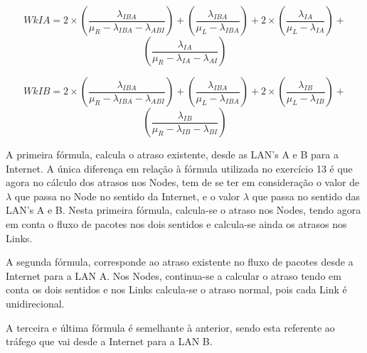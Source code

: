 \documentclass[pdftex,12pt,a4paper]{report}
\begin{document}
\[WkIA = 2 \times \left(\frac{\lambda_{IBA}}{\mu_{R} - \lambda_{IBA} - \lambda_{ABI}}\right) + 
\left(\frac{\lambda_{IBA}}{\mu_{L} - \lambda_{IBA}}\right) + 
 2 \times \left(\frac{\lambda_{IA}}{\mu_{L} - \lambda_{IA}}\right) + \]
\[\left(\frac{\lambda_{IA}}{\mu_{R} - \lambda_{IA} - \lambda_{AI}}\right)\]

\[WkIB = 2 \times \left(\frac{\lambda_{IBA}}{\mu_{R} - \lambda_{IBA} - \lambda_{ABI}}\right) + 
\left(\frac{\lambda_{IBA}}{\mu_{L} - \lambda_{IBA}}\right) + 
 2 \times \left(\frac{\lambda_{IB}}{\mu_{L} - \lambda_{IB}}\right) + \]
\[\left(\frac{\lambda_{IB}}{\mu_{R} - \lambda_{IB} - \lambda_{BI}}\right)\]

A primeira fórmula, calcula o atraso existente, desde as LAN's A e B para a Internet. A única diferença em relação à fórmula utilizada no exercício 13 é que agora no cálculo dos atrasos nos Nodes, tem de se ter em consideração o valor de $\lambda$ que passa no Node no sentido da Internet, e o valor $\lambda$ que passa no sentido das LAN's A e B. Nesta primeira fórmula, calcula-se o atraso nos Nodes, tendo agora em conta o fluxo de pacotes nos dois sentidos e calcula-se ainda os atrasos nos Links. 

A segunda fórmula, corresponde ao atraso existente no fluxo de pacotes desde a Internet para a LAN A. Nos Nodes, continua-se a calcular o atraso tendo em conta os dois sentidos e nos Links calcula-se o atraso normal, pois cada Link é unidirecional.

A terceira e última fórmula é semelhante à anterior, sendo esta referente ao tráfego que vai desde a Internet para a LAN B.
\end{document}
